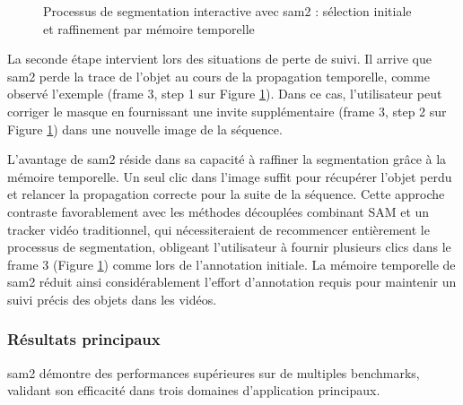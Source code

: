 \begin{figure}[H]
    \centering
    \caption{Processus de segmentation interactive avec \acrshort{sam2} : sélection initiale et raffinement par mémoire temporelle \cite{ravi_sam_2024}}
    \label{fig:ch2_sam2_12_entrainement_sam2}
\end{figure}

La seconde étape intervient lors des situations de perte de suivi. Il arrive que \acrshort{sam2} perde la trace de l'objet au cours de la propagation temporelle, comme observé l'exemple (frame 3, step 1 sur Figure \ref{fig:ch2_sam2_12_entrainement_sam2}). Dans ce cas, l'utilisateur peut corriger le masque en fournissant une invite supplémentaire (frame 3, step 2 sur Figure \ref{fig:ch2_sam2_12_entrainement_sam2}) dans une nouvelle image de la séquence.

L'avantage de \acrshort{sam2} réside dans sa capacité à raffiner la segmentation grâce à la mémoire temporelle. Un seul clic dans l'image suffit pour récupérer l'objet perdu et relancer la propagation correcte pour la suite de la séquence. Cette approche contraste favorablement avec les méthodes découplées combinant SAM et un tracker vidéo traditionnel, qui nécessiteraient de recommencer entièrement le processus de segmentation, obligeant l'utilisateur à fournir plusieurs clics dans le frame 3 (Figure \ref{fig:ch2_sam2_12_entrainement_sam2}) comme lors de l'annotation initiale. La mémoire temporelle de \acrshort{sam2} réduit ainsi considérablement l'effort d'annotation requis pour maintenir un suivi précis des objets dans les vidéos.

\subsubsection{Résultats principaux}
\acrshort{sam2} démontre des performances supérieures sur de multiples benchmarks, validant son efficacité dans trois domaines d'application principaux.

